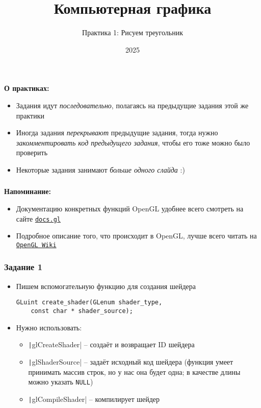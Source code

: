 \documentclass[10pt]{beamer}
\title{Компьютерная графика}
\subtitle{Практика 1: Рисуем треугольник}
\date{2025}
\begin{document}
\frame{\titlepage}

\begin{frame}[fragile]
\frametitle{}
\textbf{О практиках:}
\begin{itemize}
\item Задания идут \textit{последовательно}, полагаясь на предыдущие задания этой же практики
\item Иногда задания \textit{перекрывают} предыдущие задания, тогда нужно \textit{закомментировать код предыдущего задания}, чтобы его тоже можно было проверить
\item Некоторые задания занимают \textit{больше одного слайда} :)
\end{itemize}
\end{frame}

\begin{frame}[fragile]
\frametitle{}
\textbf{Напоминание:}
\begin{itemize}
\item Документацию конкретных функций OpenGL удобнее всего смотреть на сайте \href{https://docs.gl/}{\nolinkurl{docs.gl}}
\item Подробное описание того, что происходит в OpenGL, лучше всего читать на \href{https://www.khronos.org/opengl/wiki/Main_Page}{\texttt{OpenGL Wiki}}
\end{itemize}
\end{frame}

\begin{frame}[fragile]
\frametitle{Задание 1}
\begin{itemize}
\item Пишем вспомогательную функцию для создания шейдера
\begin{verbatim}
GLuint create_shader(GLenum shader_type,
    const char * shader_source);
\end{verbatim}
\item Нужно использовать:
\begin{itemize}
\item \texttt|glCreateShader| -- создаёт и возвращает ID шейдера
\item \texttt|glShaderSource| -- задаёт исходный код шейдера (функция умеет принимать массив строк, но у нас она будет одна; в качестве длины можно указать \verb|NULL|)
\item \texttt|glCompileShader| -- компилирует шейдер
\end{itemize}
\end{itemize}
\end{frame}
\end{document}
